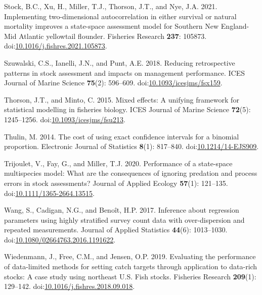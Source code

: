 \documentclass[
  12pt,
]{article}
\newlength{\cslhangindent}
\newenvironment{CSLReferences}[2] %
 {\begin{list}{}{%
  \setlength{\itemindent}{0pt}
  \setlength{\leftmargin}{0pt}
  \setlength{\parsep}{0pt}
  \ifodd #1
   \setlength{\leftmargin}{\cslhangindent}
   \setlength{\itemindent}{-1\cslhangindent}
  \fi
  \setlength{\itemsep}{#2\baselineskip}}}
 {\end{list}}
\begin{document}
\begin{CSLReferences}{1}{0}
Stock, B.C., Xu, H., Miller, T.J., Thorson, J.T., and Nye, J.A. 2021.
{Implementing two-dimensional autocorrelation in either survival or
natural mortality improves a state-space assessment model for Southern
{N}ew {E}ngland-Mid {A}tlantic yellowtail flounder}. Fisheries Research
\textbf{237}: 105873.
doi:\href{https://doi.org/10.1016/j.fishres.2021.105873}{10.1016/j.fishres.2021.105873}.

Szuwalski, C.S., Ianelli, J.N., and Punt, A.E. 2018. Reducing
retrospective patterns in stock assessment and impacts on management
performance. ICES Journal of Marine Science \textbf{75}(2): 596--609.
doi:\href{https://doi.org/10.1093/icesjms/fsx159}{10.1093/icesjms/fsx159}.

Thorson, J.T., and Minto, C. 2015. Mixed effects: A unifying framework
for statistical modelling in fisheries biology. ICES Journal of Marine
Science \textbf{72}(5): 1245--1256.
doi:\href{https://doi.org/10.1093/icesjms/fsu213}{10.1093/icesjms/fsu213}.

Thulin, M. 2014. {The cost of using exact confidence intervals for a
binomial proportion}. Electronic Journal of Statistics \textbf{8}(1):
817--840.
doi:\href{https://doi.org/10.1214/14-EJS909}{10.1214/14-EJS909}.

Trijoulet, V., Fay, G., and Miller, T.J. 2020. Performance of a
state-space multispecies model: What are the consequences of ignoring
predation and process errors in stock assessments? Journal of Applied
Ecology \textbf{57}(1): 121--135.
doi:\href{https://doi.org/10.1111/1365-2664.13515}{10.1111/1365-2664.13515}.

Wang, S., Cadigan, N.G., and Benoît, H.P. 2017. Inference about
regression parameters using highly stratified survey count data with
over-dispersion and repeated measurements. Journal of Applied Statistics
\textbf{44}(6): 1013--1030.
doi:\href{https://doi.org/10.1080/02664763.2016.1191622}{10.1080/02664763.2016.1191622}.

Wiedenmann, J., Free, C.M., and Jensen, O.P. 2019. Evaluating the
performance of data-limited methods for setting catch targets through
application to data-rich stocks: A case study using northeast {U.S.}
Fish stocks. Fisheries Research \textbf{209}(1): 129--142.
doi:\href{https://doi.org/10.1016/j.fishres.2018.09.018}{10.1016/j.fishres.2018.09.018}.


\end{CSLReferences}
\end{document}
